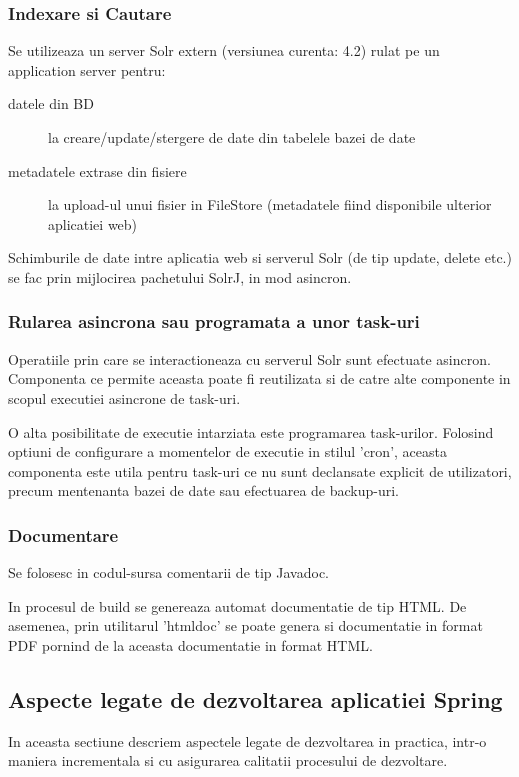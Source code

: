 \subsubsection{Indexare si Cautare}
Se utilizeaza un server Solr extern (versiunea curenta: 4.2) rulat pe un
application server pentru:
\begin{description}
\item[datele din BD] la creare/update/stergere de date din tabelele bazei de
date
\item[metadatele extrase din fisiere] la upload-ul unui fisier
in FileStore (metadatele fiind disponibile ulterior aplicatiei web)
\end{description}

Schimburile de date intre aplicatia web si serverul Solr (de tip update, delete
etc.) se fac prin mijlocirea pachetului SolrJ, in mod asincron.

\subsubsection{Rularea asincrona sau programata a unor task-uri}
Operatiile prin care se interactioneaza cu serverul Solr sunt efectuate
asincron. Componenta ce permite aceasta poate fi reutilizata si de catre alte
componente in scopul executiei asincrone de task-uri.

O alta posibilitate de executie intarziata este programarea task-urilor.
Folosind optiuni de configurare a momentelor de executie in stilul 'cron',
aceasta componenta este utila pentru task-uri ce nu sunt declansate explicit de
utilizatori, precum mentenanta bazei de date sau efectuarea de backup-uri.

\subsubsection{Documentare}
Se folosesc in codul-sursa comentarii de tip Javadoc. 

In procesul de build se genereaza automat documentatie  de tip HTML. 
De asemenea, prin utilitarul 'htmldoc' se poate genera
si documentatie in format PDF pornind de la aceasta documentatie in format HTML.

\subsection{Aspecte legate de dezvoltarea aplicatiei Spring}
In aceasta sectiune descriem aspectele legate de dezvoltarea in practica, intr-o
maniera incrementala si cu asigurarea calitatii procesului de dezvoltare.


